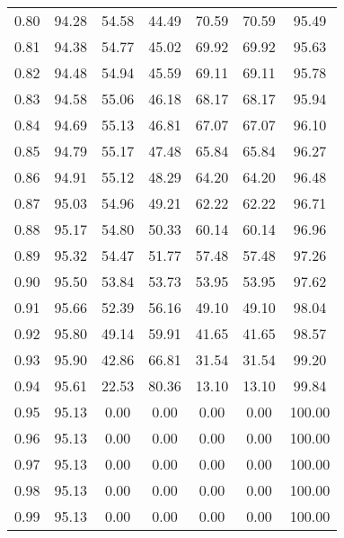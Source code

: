 \begin{tabular}{|c|c|c|c|c|c|c|}
      0.80 &     94.28 &     54.58 &      44.49 &   70.59 &      70.59 &         95.49 \\
      0.81 &     94.38 &     54.77 &      45.02 &   69.92 &      69.92 &         95.63 \\
      0.82 &     94.48 &     54.94 &      45.59 &   69.11 &      69.11 &         95.78 \\
      0.83 &     94.58 &     55.06 &      46.18 &   68.17 &      68.17 &         95.94 \\
      0.84 &     94.69 &     55.13 &      46.81 &   67.07 &      67.07 &         96.10 \\
      0.85 &     94.79 &     55.17 &      47.48 &   65.84 &      65.84 &         96.27 \\
      0.86 &     94.91 &     55.12 &      48.29 &   64.20 &      64.20 &         96.48 \\
      0.87 &     95.03 &     54.96 &      49.21 &   62.22 &      62.22 &         96.71 \\
      0.88 &     95.17 &     54.80 &      50.33 &   60.14 &      60.14 &         96.96 \\
      0.89 &     95.32 &     54.47 &      51.77 &   57.48 &      57.48 &         97.26 \\
      0.90 &     95.50 &     53.84 &      53.73 &   53.95 &      53.95 &         97.62 \\
      0.91 &     95.66 &     52.39 &      56.16 &   49.10 &      49.10 &         98.04 \\
      0.92 &     95.80 &     49.14 &      59.91 &   41.65 &      41.65 &         98.57 \\
      0.93 &     95.90 &     42.86 &      66.81 &   31.54 &      31.54 &         99.20 \\
      0.94 &     95.61 &     22.53 &      80.36 &   13.10 &      13.10 &         99.84 \\
      0.95 &     95.13 &      0.00 &       0.00 &    0.00 &       0.00 &        100.00 \\
      0.96 &     95.13 &      0.00 &       0.00 &    0.00 &       0.00 &        100.00 \\
      0.97 &     95.13 &      0.00 &       0.00 &    0.00 &       0.00 &        100.00 \\
      0.98 &     95.13 &      0.00 &       0.00 &    0.00 &       0.00 &        100.00 \\
      0.99 &     95.13 &      0.00 &       0.00 &    0.00 &       0.00 &        100.00 \\
\bottomrule
\end{tabular}
